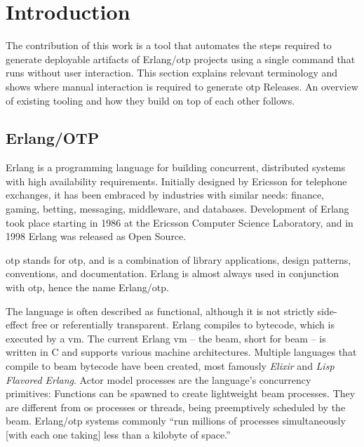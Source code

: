 \section{Introduction}

The contribution of this work is a tool that automates the steps required to generate deployable artifacts of Erlang/\acrshort{otp} projects using a single command that runs without user interaction.
This section explains relevant terminology and shows where manual interaction is required to generate \acrshort{otp} Releases. An overview of existing tooling and how they build on top of each other follows.

\subsection{Erlang/OTP}

Erlang is a programming language for building concurrent, distributed systems with high availability requirements. Initially designed by Ericsson for telephone exchanges, it has been embraced by industries with similar needs: finance, gaming, betting, messaging, middleware, and databases. Development of Erlang took place starting in 1986 at the Ericsson Computer Science Laboratory, and in 1998 Erlang was released as Open Source.~\cite{armstrong2007history}

\acrshort{otp} stands for \acrlong{otp}, and is a combination of library applications, design patterns, conventions, and documentation. Erlang is almost always used in conjunction with \acrshort{otp}, hence the name Erlang/\acrshort{otp}.~\cite{ferd}

The language is often described as functional, although it is not strictly side-effect free or referentially transparent. Erlang compiles to bytecode, which is executed by a \acrfull{vm}. The current Erlang \acrshort{vm} – the \acrshort{beam}, short for \acrlong{beam} – is written in C and supports various machine architectures. Multiple languages that compile to \acrshort{beam} bytecode have been created, most famously \emph{Elixir} and \emph{Lisp Flavored Erlang}. Actor model processes are the language's concurrency primitives: Functions can be spawned to create lightweight \acrshort{beam} processes. They are different from \acrshort{os} processes or threads, being preemptively scheduled by the \acrshort{beam}. Erlang/\acrshort{otp} systems commonly ``run millions of processes simultaneously [with each one taking] less than a kilobyte of space.''~\cite{larson}

